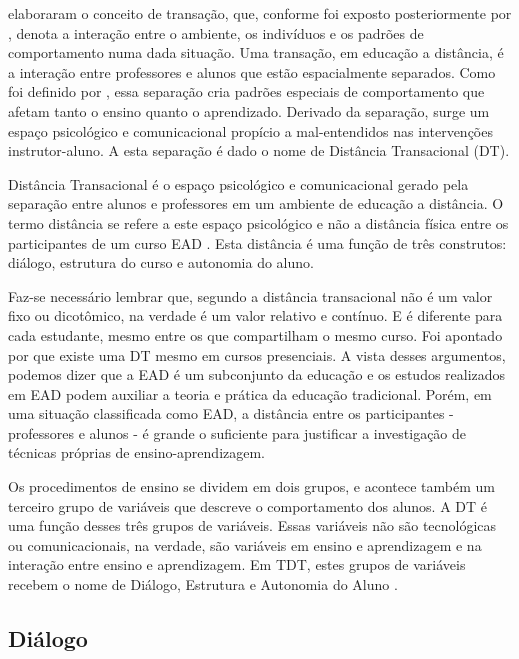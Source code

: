  elaboraram o conceito de transação, que, conforme
foi exposto posteriormente por , denota a
interação entre o ambiente, os indivíduos e os padrões de comportamento numa
dada situação. Uma transação, em educação a distância, é a interação entre
professores e alunos que estão espacialmente separados. Como foi definido por
, essa separação cria padrões especiais de
comportamento que afetam tanto o ensino quanto o aprendizado. Derivado da
separação, surge um espaço psicológico e comunicacional propício a
mal-entendidos nas intervenções instrutor-aluno. A esta separação é dado o nome
de Distância Transacional (DT).

Distância Transacional é o espaço psicológico e comunicacional gerado pela
separação entre alunos e professores em um ambiente de educação a distância. O
termo distância se refere a este espaço psicológico e não a distância física
entre os participantes de um curso EAD \cite{goel2012transactional}. Esta
distância é uma função de três construtos: diálogo, estrutura do curso e
autonomia do aluno.

Faz-se necessário lembrar que, segundo  a
distância transacional não é um valor fixo ou dicotômico, na verdade é um valor
relativo e contínuo. E é diferente para cada estudante, mesmo entre os que
compartilham o mesmo curso. Foi apontado por  que
existe uma DT mesmo em cursos presenciais. A vista desses argumentos, podemos
dizer que a EAD é um subconjunto da educação e os estudos realizados em EAD
podem auxiliar a teoria e prática da educação tradicional. Porém, em uma
situação classificada como EAD, a distância entre os participantes - professores
e alunos - é grande o suficiente para justificar a investigação de técnicas
próprias de ensino-aprendizagem.

Os procedimentos de ensino se dividem em dois grupos, e acontece também um
terceiro grupo de variáveis que descreve o comportamento dos alunos. A DT é uma
função desses três grupos de variáveis. Essas variáveis não são tecnológicas ou
comunicacionais, na verdade, são variáveis em ensino e aprendizagem e na
interação entre ensino e aprendizagem. Em TDT, estes grupos de variáveis recebem
o nome de Diálogo, Estrutura e Autonomia do Aluno \cite{moore2008teoria}.

\subsection{Diálogo}

